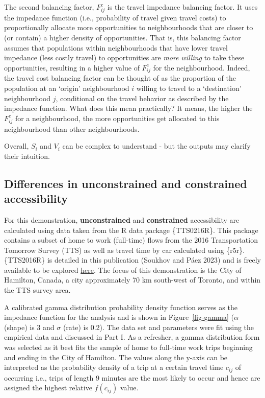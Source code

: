 \documentclass[12pt, oneside]{report}
\begin{document}
The second balancing factor, \(F^c_{ij}\) is the travel impedance
balancing factor. It uses the impedance function (i.e., probability of
travel given travel costs) to proportionally allocate more opportunities
to neighbourhoods that are closer to (or contain) a higher density of
opportunities. That is, this balancing factor assumes that populations
within neighbourhoods that have lower travel impedance (less costly
travel) to opportunities are \emph{more willing} to take these
opportunities, resulting in a higher value of \(F^c_{ij}\) for the
neighbourhood. Indeed, the travel cost balancing factor can be thought
of as the proportion of the population at an `origin' neighbourhood
\(i\) willing to travel to a `destination' neighbourhood \(j\),
conditional on the travel behavior as described by the impedance
function. What does this mean practically? It means, the higher the
\(F^c_{ij}\) for a neighbourhood, the more opportunities get allocated
to this neighbourhood than other neighbourhoods.

Overall, \(S_i\) and \(V_i\) can be complex to understand - but the
outputs may clarify their intuition.

\newpage

\hypertarget{differences-in-unconstrained-and-constrained-accessibility}{%
\subsection{Differences in unconstrained and constrained
accessibility}\label{differences-in-unconstrained-and-constrained-accessibility}}

For this demonstration, \textbf{unconstrained} and \textbf{constrained}
accessibility are calculated using data taken from the R data package
\{TTS0216R\}. This package contains a subset of home to work (full-time)
flows from the 2016 Transportation Tomorrow Survey (TTS) as well as
travel time by car calculated using \{r5r\}. \{TTS2016R\} is detailed in
this publication (Soukhov and Páez 2023) and is freely available to be
explored \href{https://soukhova.github.io/TTS2016R/}{here}. The focus of
this demonstration is the City of Hamilton, Canada, a city approximately
70 km south-west of Toronto, and within the TTS survey area.

A calibrated gamma distribution probability density function serves as
the impedance function for the analysis and is shown in
Figure~\ref{fig-gamma} (\(\alpha\) (shape) is 3 and \(\sigma\) (rate) is
0.2). The data set and parameters were fit using the empirical data and
discussed in Part I. As a refresher, a gamma distribution form was
selected as it best fits the sample of home to full-time work trips
beginning and ending in the City of Hamilton. The values along the
y-axis can be interpreted as the probability density of a trip at a
certain travel time \(c_{ij}\) of occurring i.e., trips of length 9
minutes are the most likely to occur and hence are assigned the highest
relative \(f(c_{ij})\) value.
\end{document}
